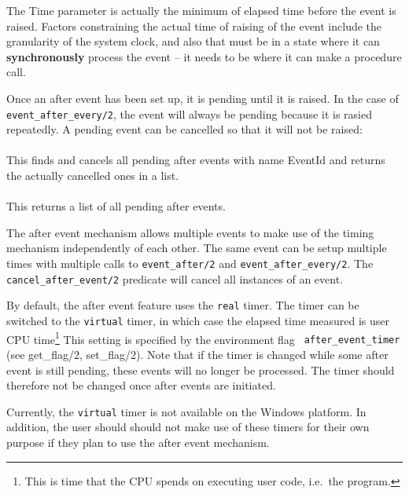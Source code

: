 The Time parameter is actually the minimum of elapsed time before the
event is raised. Factors constraining the actual time of raising of the
event include the granularity of the system clock, and also that {\eclipse}
must be in a state where it can {\bf synchronously } process the event -- 
it needs to be where it can make a procedure call. 

\begin{sloppypar}
Once an after event has been set up, it is pending until it is raised. In
the case of \verb'event_after_every/2', the event will always be pending
because it is rasied repeatedly. A pending event can be cancelled so that
it will not be raised:
\end{sloppypar}

\paragraph{} 
This finds and cancels all pending after events with name EventId and returns
the actually cancelled ones in a list.

\paragraph{} 
This returns a list of all pending after events.

The after event mechanism allows multiple events to make use of the timing
mechanism independently of each other. The same event can be setup
multiple times with multiple calls to \verb'event_after/2' and
\verb'event_after_every/2'. The \verb'cancel_after_event/2' predicate 
will cancel all instances of an event.

By default, the after event feature uses the {\tt real} timer. The
timer can be switched to the {\tt virtual} timer, in which case the
elapsed time measured is user CPU time\footnote{This is time that the
CPU spends on executing user code, i.e.\ the {\eclipse} program.} This
setting is specified by the {\eclipse} environment flag {\tt
after_event_timer} (see get_flag/2, set_flag/2). Note that if the
timer is changed while some after event is still pending, these events
will no longer be processed. The timer should therefore not be changed
once after events are initiated.

Currently, the {\tt virtual} timer is not available on the Windows
platform. In addition, the user should should not make use of these
timers for their own purpose if they plan to use the after event
mechanism.


